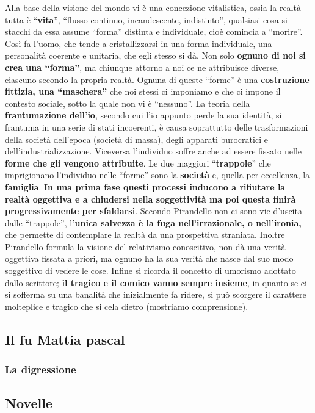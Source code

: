 \documentclass[10pt]{report}
\begin{document}
		Alla base della visione del mondo vi è una concezione vitalistica, ossia la realtà tutta è “\textbf{vita}”, “flusso continuo, incandescente, indistinto”, qualsiasi cosa si stacchi da essa assume “forma” distinta e individuale, cioè comincia a “morire”. 
		Così fa l’uomo, che tende a cristallizzarsi in una forma individuale, una personalità coerente e unitaria, che egli stesso si dà. Non solo\textbf{ ognuno di noi si crea una “forma”}, ma chiunque attorno a noi ce ne attribuisce diverse, ciascuno secondo la propria realtà.
		Ognuna di queste “forme” è una \textbf{costruzione fittizia, una “maschera”} che noi stessi ci imponiamo e che ci impone il contesto sociale, sotto la quale non vi è “nessuno”. 
		La teoria della \textbf{frantumazione dell’io}, secondo cui l’io appunto perde la sua identità, si frantuma in una serie di stati incoerenti, è causa soprattutto delle trasformazioni della società dell’epoca (società di massa), degli apparati burocratici e dell'industrializzazione. 
		Viceversa l’individuo soffre anche ad essere fissato nelle \textbf{forme che gli vengono attribuite}.
		Le due maggiori “\textbf{trappole}” che imprigionano l’individuo nelle “forme” sono la \textbf{società} e, quella per eccellenza, la \textbf{famiglia}. 
		\textbf{In una prima fase questi processi inducono a rifiutare la realtà oggettiva e a chiudersi nella soggettività ma poi questa finirà progressivamente per sfaldarsi}.
		Secondo Pirandello non ci sono vie d’uscita dalle “trappole”, l\textbf{’unica salvezza è la fuga nell’irrazionale, o nell’ironia,} che permette di contemplare la realtà da una prospettiva straniata.
		Inoltre Pirandello formula la visione del relativismo conoscitivo, non dà una verità oggettiva fissata a priori, ma ognuno ha la sua verità che nasce dal suo modo soggettivo di vedere le cose.
		Infine si ricorda il concetto di umorismo adottato dallo scrittore;\textbf{ il tragico e il comico vanno sempre insieme}, in quanto se ci si sofferma su una banalità che inizialmente fa ridere, si può scorgere il carattere molteplice e tragico che si cela dietro (mostriamo comprensione).
		\subsection{Il fu Mattia pascal}
			\subsubsection{La digressione}	
		\subsection{Novelle}
	
\end{document}
